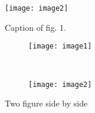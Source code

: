 \begin{figure}
	\centering
	\texttt{[image: image2]}
	\caption{Caption of fig. 1.}
	\label{fig:image2}
\end{figure} 

\begin{figure}
\centering
\begin{subfigure}[b]{0.45\textwidth}
  \centering
  \texttt{[image: image1]}
  \caption{}
  \label{fig:im1}
 \end{subfigure}
~
\begin{subfigure}[b]{0.45\textwidth}
  \centering
  \texttt{[image: image2]}
  \caption{}
  \label{fig:im2}
\end{subfigure}
\caption{Two figure side by side}
\label{fig:subfigs cap}
\end{figure}
